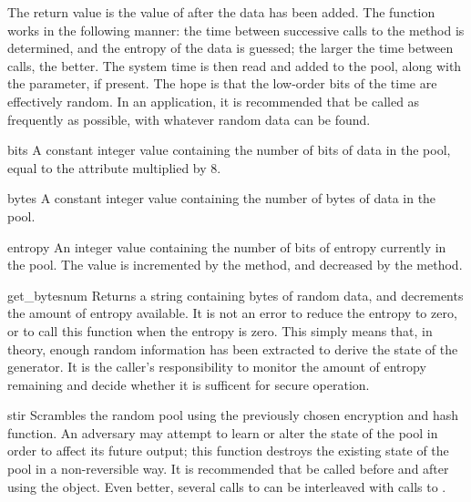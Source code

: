 \documentclass{howto}
\begin{document}
The return value is the value of  after the data has
been added.  The function works in the following manner: the time
between successive calls to the  method is determined,
and the entropy of the data is guessed; the larger the time between
calls, the better.  The system time is then read and added to the pool,
along with the  parameter, if present.  The hope is that the
low-order bits of the time are effectively random.  In an application,
it is recommended that  be called as frequently as
possible, with whatever random data can be found.

\begin{memberdesc}{bits}
A constant integer value containing the number of bits of data in
the pool, equal to the  attribute multiplied by 8.
\end{memberdesc}

\begin{memberdesc}{bytes}
A constant integer value containing the number of bytes of data in
the pool.
\end{memberdesc}

\begin{memberdesc}{entropy}
An integer value containing the number of bits of entropy currently in
the pool.  The value is incremented by the  method,
and decreased by the  method.
\end{memberdesc}

\begin{methoddesc}{get_bytes}{num}
Returns a string containing  bytes of random data, and
decrements the amount of entropy available.  It is not an error to
reduce the entropy to zero, or to call this function when the entropy
is zero.  This simply means that, in theory, enough random information has been
extracted to derive the state of the generator.  It is the caller's
responsibility to monitor the amount of entropy remaining and decide
whether it is sufficent for secure operation.
\end{methoddesc}

\begin{methoddesc}{stir}{}
Scrambles the random pool using the previously chosen encryption and
hash function.  An adversary may attempt to learn or alter the state
of the pool in order to affect its future output; this function
destroys the existing state of the pool in a non-reversible way.  It
is recommended that  be called before and after using
the  object.  Even better, several calls to
 can be interleaved with calls to .
\end{methoddesc}
\end{document}
